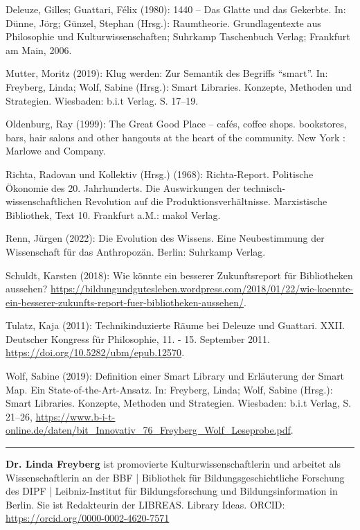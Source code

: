 \documentclass[a4paper,
fontsize=11pt,
oneside,
numbers=noperiodatend,
parskip=half-,
bibliography=totoc,
final
]{scrartcl}
\begin{document}
Deleuze, Gilles; Guattari, Félix (1980): 1440 -- Das Glatte und das
Gekerbte. In: Dünne, Jörg; Günzel, Stephan (Hrsg.): Raumtheorie.
Grundlagentexte aus Philosophie und Kulturwissenschaften; Suhrkamp
Taschenbuch Verlag; Frankfurt am Main, 2006.

Mutter, Moritz (2019): Klug werden: Zur Semantik des Begriffs
\enquote{smart}. In: Freyberg, Linda; Wolf, Sabine (Hrsg.): Smart
Libraries. Konzepte, Methoden und Strategien. Wiesbaden: b.i.t Verlag.
S. 17--19.

Oldenburg, Ray (1999): The Great Good Place -- cafés, coffee shops.
bookstores, bars, hair salons and other hangouts at the heart of the
community. New York : Marlowe and Company.

Richta, Radovan und Kollektiv (Hrsg.) (1968): Richta-Report. Politische
Ökonomie des 20. Jahrhunderts. Die Auswirkungen der
technisch-wissenschaftlichen Revolution auf die Produktionsverhältnisse.
Marxistische Bibliothek, Text 10. Frankfurt a.M.: makol Verlag.

Renn, Jürgen (2022): Die Evolution des Wissens. Eine Neubestimmung der
Wissenschaft für das Anthropozän. Berlin: Suhrkamp Verlag.

Schuldt, Karsten (2018): Wie könnte ein besserer Zukunftsreport für
Bibliotheken aussehen?
\href{https://bildungundgutesleben.wordpress.com/2018/01/22/wie-koennte-ein-besserer-zukunftsreport-fuer-bibliotheken-aussehen/}{https://bildungundgutesleben.wordpress.com/2018/01/22/wie-koennte-ein-besserer-zukunfts-report-fuer-bibliotheken-aussehen/}.

Tulatz, Kaja (2011): Technikinduzierte Räume bei Deleuze und Guattari.
XXII. Deutscher Kongress für Philosophie, 11. - 15. September 2011.
\url{https://doi.org/10.5282/ubm/epub.12570}.

Wolf, Sabine (2019): Definition einer Smart Library und Erläuterung der
Smart Map. Ein State-of-the-Art-Ansatz. In: Freyberg, Linda; Wolf,
Sabine (Hrsg.): Smart Libraries. Konzepte, Methoden und Strategien.
Wiesbaden: b.i.t Verlag, S. 21--26,
\url{https://www.b-i-t-online.de/daten/bit_Innovativ_76_Freyberg_Wolf_Leseprobe.pdf}.


\begin{center}\rule{0.5\linewidth}{0.5pt}\end{center}

\textbf{Dr. Linda Freyberg} ist promovierte Kulturwissenschaftlerin und arbeitet als Wissenschaftlerin an der BBF | Bibliothek für Bildungsgeschichtliche Forschung des DIPF | Leibniz-Institut für Bildungsforschung und Bildungsinformation in Berlin. Sie ist Redakteurin der LIBREAS. Library Ideas. ORCID: \url{https://orcid.org/0000-0002-4620-7571}
\end{document}
